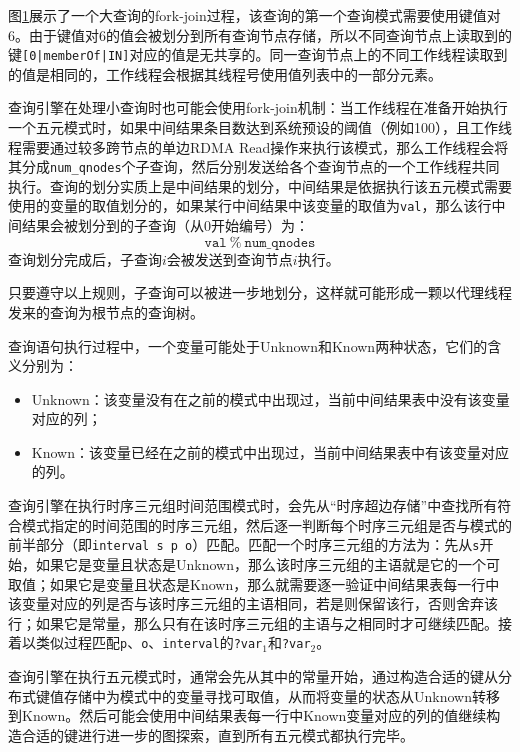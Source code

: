图\ref{fork-join}展示了一个大查询的fork-join过程，该查询的第一个查询模式需要使用键值对6。由于键值对6的值会被划分到所有查询节点存储，所以不同查询节点上读取到的键\texttt{[0|memberOf|IN]}对应的值是无共享的。同一查询节点上的不同工作线程读取到的值是相同的，工作线程会根据其线程号使用值列表中的一部分元素。
\begin{figure}[!htb]
\label{fork-join}
\end{figure}

查询引擎在处理小查询时也可能会使用fork-join机制：当工作线程在准备开始执行一个五元模式时，如果中间结果条目数达到系统预设的阈值（例如100），且工作线程需要通过较多跨节点的单边RDMA Read操作来执行该模式，那么工作线程会将其分成\texttt{num\_qnodes}个子查询，然后分别发送给各个查询节点的一个工作线程共同执行。查询的划分实质上是中间结果的划分，中间结果是依据执行该五元模式需要使用的变量的取值划分的，如果某行中间结果中该变量的取值为\texttt{val}，那么该行中间结果会被划分到的子查询（从0开始编号）为：
\begin{equation}
    \mathtt{val \ \% \ num\_qnodes}
\end{equation}
查询划分完成后，子查询$i$会被发送到查询节点$i$执行。

只要遵守以上规则，子查询可以被进一步地划分，这样就可能形成一颗以代理线程发来的查询为根节点的查询树。

查询语句执行过程中，一个变量可能处于Unknown和Known两种状态，它们的含义分别为：
\begin{itemize}
    \item Unknown：该变量没有在之前的模式中出现过，当前中间结果表中没有该变量对应的列；
    \item Known：该变量已经在之前的模式中出现过，当前中间结果表中有该变量对应的列。
\end{itemize}

查询引擎在执行时序三元组时间范围模式时，会先从“时序超边存储”中查找所有符合模式指定的时间范围的时序三元组，然后逐一判断每个时序三元组是否与模式的前半部分（即\texttt{interval s p o}）匹配。匹配一个时序三元组的方法为：先从\texttt{s}开始，如果它是变量且状态是Unknown，那么该时序三元组的主语就是它的一个可取值；如果它是变量且状态是Known，那么就需要逐一验证中间结果表每一行中该变量对应的列是否与该时序三元组的主语相同，若是则保留该行，否则舍弃该行；如果它是常量，那么只有在该时序三元组的主语与之相同时才可继续匹配。接着以类似过程匹配\texttt{p}、\texttt{o}、\texttt{interval}的\texttt{?var$_1$}和\texttt{?var$_2$}。

查询引擎在执行五元模式时，通常会先从其中的常量开始，通过构造合适的键从分布式键值存储中为模式中的变量寻找可取值，从而将变量的状态从Unknown转移到Known。然后可能会使用中间结果表每一行中Known变量对应的列的值继续构造合适的键进行进一步的图探索，直到所有五元模式都执行完毕。
